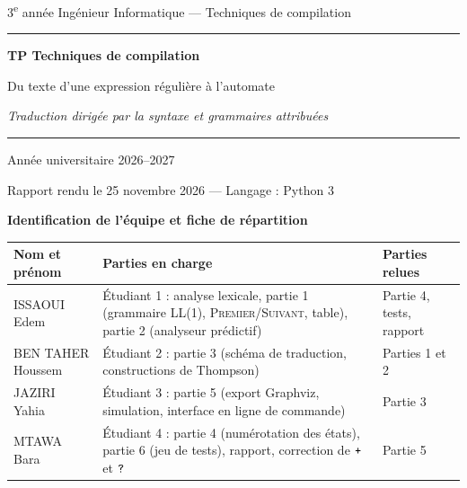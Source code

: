 \documentclass[12pt,a4paper]{article}
\newcommand{\Prem}{\textsc{Premier}}
\newcommand{\Suiv}{\textsc{Suivant}}
\newcommand{\tok}[1]{\ensuremath{\text{\fontsize{10}{12}\selectfont\ttfamily #1}}}
\begin{document}
\begin{titlepage}
\centering
\vspace*{1.2cm}
{\fontsize{14}{17}\selectfont\color{gris} 3\textsuperscript{e} année Ingénieur Informatique --- Techniques de compilation\par}
\vspace{2.2cm}
{\color{bleu}\rule{\linewidth}{1pt}\par}
\vspace{0.5cm}
{\fontsize{24}{29}\selectfont\bfseries\color{bleu} TP Techniques de compilation\par}
\vspace{0.4cm}
{\fontsize{18}{22}\selectfont\color{bleu} Du texte d'une expression régulière à l'automate\par}
\vspace{0.3cm}
{\fontsize{12}{15}\selectfont\itshape Traduction dirigée par la syntaxe et grammaires attribuées\par}
\vspace{0.5cm}
{\color{bleu}\rule{\linewidth}{1pt}\par}
\vspace{1.2cm}
{\fontsize{14}{17}\selectfont Année universitaire 2026--2027\par}
\vspace{0.3cm}
{Rapport rendu le 25 novembre 2026 --- Langage : Python 3\par}
\vspace{1.6cm}
{\fontsize{14}{17}\selectfont\bfseries\color{bleu} Identification de l'équipe et fiche de répartition\par}
\vspace{0.4cm}
{\small
\begin{tabularx}{\linewidth}{>{\raggedright\arraybackslash}p{3.6cm} L >{\raggedright\arraybackslash}p{3.4cm}}
\toprule
Nom et prénom & Parties en charge & Parties relues \\
\midrule
ISSAOUI Edem & Étudiant 1 : analyse lexicale, partie 1 (grammaire LL(1), \Prem/\Suiv, table), partie 2 (analyseur prédictif) & Partie 4, tests, rapport \\ \addlinespace
BEN TAHER Houssem & Étudiant 2 : partie 3 (schéma de traduction, constructions de Thompson) & Parties 1 et 2 \\ \addlinespace
JAZIRI Yahia & Étudiant 3 : partie 5 (export Graphviz, simulation, interface en ligne de commande) & Partie 3 \\ \addlinespace
MTAWA Bara & Étudiant 4 : partie 4 (numérotation des états), partie 6 (jeu de tests), rapport, correction de \tok{+} et \tok{?} & Partie 5 \\
\bottomrule
\end{tabularx}\par}
\vfill
\end{titlepage}
\end{document}

